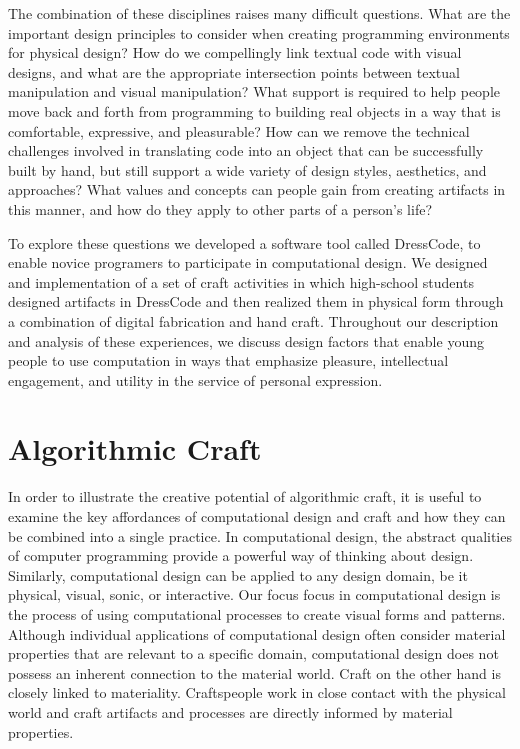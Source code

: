 \documentclass{sigchi}
\begin{document}
The combination of these disciplines raises many difficult questions. What are the important design principles to consider when creating programming environments for physical design? How do we compellingly link textual code with visual designs, and what are the appropriate intersection points between textual manipulation and visual manipulation? What support is required to help people move back and forth from programming to building real objects in a way that is comfortable, expressive, and pleasurable? How can we remove the technical challenges involved in translating code into an object that can be successfully built by hand, but still support a wide variety of design styles, aesthetics, and approaches? What values and concepts can people gain from creating artifacts in this manner, and how do they apply to other parts of a person's life?

To explore these questions we developed a software tool called DressCode, to enable novice programers to participate in computational design. We designed and implementation of a set of craft activities in which high-school students designed artifacts in DressCode and then realized them in physical form through a combination of digital fabrication and hand craft. Throughout our description and analysis of these experiences, we discuss design factors that enable young people to use computation in ways that emphasize pleasure, intellectual engagement, and utility in the service of personal expression. %

\section{Algorithmic Craft}
In order to illustrate the creative potential of algorithmic craft, it is useful to examine the key affordances of computational design and craft and how they can be combined into a single practice. In computational design, the abstract qualities of computer programming provide a powerful way of thinking about design. Similarly, computational design can be applied to any design domain, be it physical, visual, sonic, or interactive. Our focus focus in computational design is the process of using computational processes to create visual forms and patterns. Although individual applications of computational design often consider material properties that are relevant to a specific domain, computational design does not possess an inherent connection to the material world. Craft on the other hand is closely linked to materiality. Craftspeople work in close contact with the physical world and craft artifacts and processes are directly informed by material properties. 
\end{document}
